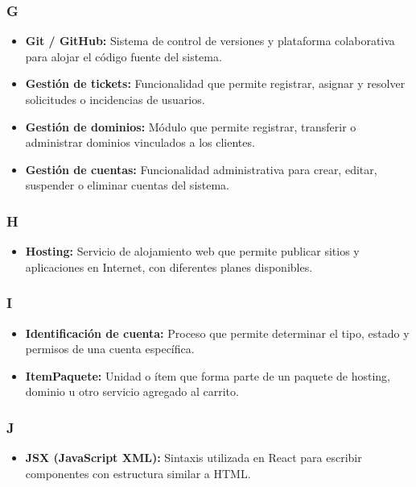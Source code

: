 \subsubsection*{G}
\begin{itemize}
    \item \textbf{Git / GitHub:} Sistema de control de versiones y plataforma colaborativa para alojar el código fuente del sistema.
    \item \textbf{Gestión de tickets:} Funcionalidad que permite registrar, asignar y resolver solicitudes o incidencias de usuarios.
    \item \textbf{Gestión de dominios:} Módulo que permite registrar, transferir o administrar dominios vinculados a los clientes.
    \item \textbf{Gestión de cuentas:} Funcionalidad administrativa para crear, editar, suspender o eliminar cuentas del sistema.
\end{itemize}

\subsubsection*{H}
\begin{itemize}
\item \textbf {Hosting:} Servicio de alojamiento web que permite publicar sitios y aplicaciones en Internet, con diferentes planes disponibles.
\end{itemize}

\subsubsection*{I}
\begin{itemize}
    \item \textbf {Identificación de cuenta:} Proceso que permite determinar el tipo, estado y permisos de una cuenta específica.
    \item \textbf {ItemPaquete:} Unidad o ítem que forma parte de un paquete de hosting, dominio u otro servicio agregado al carrito.
\end{itemize}

\subsubsection*{J}
\begin{itemize}
    \item \textbf {JSX (JavaScript XML):} Sintaxis utilizada en React para escribir componentes con estructura similar a HTML.
\end{itemize}

